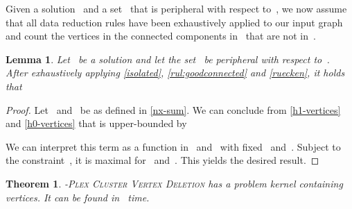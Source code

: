 \documentclass[12pt, a4paper, abstracton]{scrreprt}
\newcommand{\name}{\textsc}
\newcommand{\pvd}[1]{\name{\mbox{-Plex} Cluster Vertex Deletion}}
\newcounter{theorem}
\newtheorem{satz}{Theorem}[chapter]
\newtheorem{lemma}{Lemma}[chapter]
\theoremstyle{definition}
\theoremstyle{remark}
\begin{document}
\noindent Given a solution~ and a set~ that is peripheral with respect to~, we now assume that all data reduction rules have been exhaustively applied to our input graph~ and count the vertices in the connected components in~ that are not in~.

\begin{lemma}\label{unmarked-boundary}
  Let~ be a solution and let the set~ be peripheral with respect to~. After exhaustively applying \autoref{isolated}, \autoref{rul:goodconnected} and \autoref{ruecken}, it holds that
  
\end{lemma}

\begin{proof}Let~ and~ be as
  defined in \autoref{nx-sum}. We can conclude from
  \autoref{h1-vertices} and \autoref{h0-vertices} that
   is upper-bounded by
  
  We can interpret this term as a function in~
  and~ with fixed~ and~. Subject to the
  constraint~, it is maximal for~ and~. This
  yields the desired result.
\end{proof}

\begin{satz}\label{kern-size}
  \pvd 2 has a problem kernel containing 
  vertices. It can be found in ~time.
\end{satz}
\end{document}
